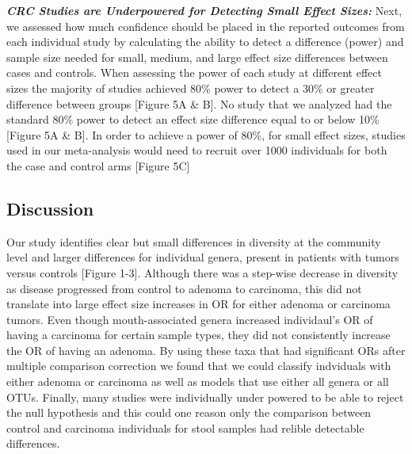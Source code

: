 \documentclass[12pt,]{article}
\begin{document}
\textbf{\emph{CRC Studies are Underpowered for Detecting Small Effect
Sizes:}} Next, we assessed how much confidence should be placed in the
reported outcomes from each individual study by calculating the ability
to detect a difference (power) and sample size needed for small, medium,
and large effect size differences between cases and controls. When
assessing the power of each study at different effect sizes the majority
of studies achieved 80\% power to detect a 30\% or greater difference
between groups {[}Figure 5A \& B{]}. No study that we analyzed had the
standard 80\% power to detect an effect size difference equal to or
below 10\% {[}Figure 5A \& B{]}. In order to achieve a power of 80\%,
for small effect sizes, studies used in our meta-analysis would need to
recruit over 1000 individuals for both the case and control arms
{[}Figure 5C{]}

\newpage

\subsection{Discussion}\label{discussion}

Our study identifies clear but small differences in diversity at the
community level and larger differences for individual genera, present in
patients with tumors versus controls {[}Figure 1-3{]}. Although there
was a step-wise decrease in diversity as disease progressed from control
to adenoma to carcinoma, this did not translate into large effect size
increases in OR for either adenoma or carcinoma tumors. Even though
mouth-associated genera increased individaul's OR of having a carcinoma
for certain sample types, they did not consistently increase the OR of
having an adenoma. By using these taxa that had significant ORs after
multiple comparison correction we found that we could classify
indviduals with either adenoma or carcinoma as well as models that use
either all genera or all OTUs. Finally, many studies were individually
under powered to be able to reject the null hypothesis and this could
one reason only the comparison between control and carcinoma individuals
for stool samples had relible detectable differences.
\end{document}
